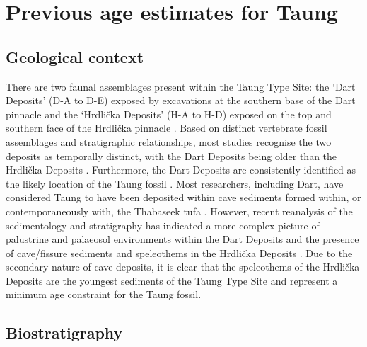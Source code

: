 \documentclass[11pt]{article}
\begin{document}
\section{Previous age estimates for Taung} \label{sec:review}

\subsection{Geological context}
\label{sec:geology}

There are two faunal assemblages present within the Taung Type Site:
the `Dart Deposits' (D-A to D-E) exposed by excavations at the
southern base of the Dart pinnacle \citep{mckee2016} and the
`Hrdli\v{c}ka Deposits' (H-A to H-D) exposed on the top and southern
face of the Hrdli\v{c}ka pinnacle
\citep{hrdlicka1925,mckee1994}. Based on distinct vertebrate fossil
assemblages and stratigraphic relationships, most studies recognise
the two deposits as temporally distinct, with the Dart Deposits being
older than the Hrdli\v{c}ka Deposits
\citep{mckee1994,mckee2016,frost2022}. Furthermore, the Dart Deposits
are consistently identified as the likely location of the Taung fossil
\citep{tobias1993,mckee2016,hopley2022}. Most researchers, including
Dart, have considered Taung to have been deposited within cave
sediments formed within, or contemporaneously with, the Thabaseek tufa
\citep[e.g.][]{peabody1954,tobias1993,mckee2016}. However, recent
reanalysis of the sedimentology and stratigraphy has indicated a more
complex picture of palustrine and palaeosol environments within the
Dart Deposits \citep{hopley2013,kuhn2015,parker2016} and the presence
of cave/fissure sediments and speleothems in the Hrdli\v{c}ka Deposits
\citep[][see Environments Chapter]{hopley2022}. Due to the secondary
nature of cave deposits, it is clear that the speleothems of the
Hrdli\v{c}ka Deposits are the youngest sediments of the Taung Type
Site and represent a minimum age constraint for the Taung fossil.

\subsection{Biostratigraphy}
\label{sec:biostrat}
\end{document}

